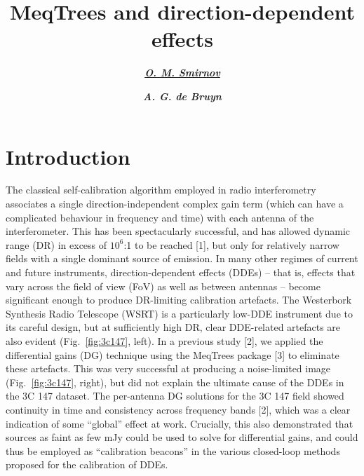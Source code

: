 \documentclass{aps2010} \special{papersize=8.5in,11in}
\title{MeqTrees and direction-dependent effects}
\author[org1]{\textbf{{\emph{\underline{O. M. Smirnov}}}}}
\author[org1]{\textbf{{\emph{A. G. de Bruyn}}}}
\begin{document}
\maketitleblock


\section{Introduction}

\noindent The classical self-calibration algorithm employed in radio interferometry  associates a single direction-independent complex gain term (which can have a complicated behaviour in frequency and time) with each antenna of the interferometer. This has been spectacularly successful, and has allowed dynamic range (DR) in excess of $10^6$:1 to be reached [1], but only for relatively narrow fields with a single dominant source of emission. In many other regimes of current and future instruments, direction-dependent effects (DDEs) -- that is, effects that vary across the field of view (FoV) as well as between antennas -- become significant enough to produce DR-limiting calibration artefacts. The Westerbork Synthesis Radio Telescope (WSRT) is a particularly low-DDE instrument due to its careful design, but at sufficiently high DR, clear DDE-related artefacts are also evident  (Fig.~\ref{fig:3c147}, left). In a previous study [2], we applied the differential gains (DG) technique using the MeqTrees package [3] to eliminate these artefacts. This was very successful at producing a noise-limited image (Fig.~\ref{fig:3c147}, right), but did not explain the ultimate cause of the DDEs in the 3C 147 dataset. The per-antenna DG solutions for the 3C 147 field showed continuity in time and consistency across frequency bands [2], which was a clear indication of some ``global'' effect at work. Crucially, this also demonstrated that sources as faint as few mJy could be used to solve for differential gains, and could thus be employed as ``calibration beacons'' in the various closed-loop methods proposed for the calibration of DDEs.
\end{document}
